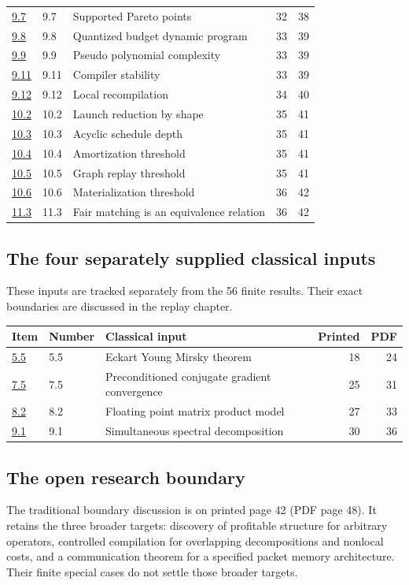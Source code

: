 {\begin{longtable}{@{}p{.10\linewidth}p{.11\linewidth}p{.51\linewidth}rr@{}}
\hyperref[result:9.7]{9.7} & 9.7 & Supported Pareto points & 32 & 38\\
\hyperref[result:9.8]{9.8} & 9.8 & Quantized budget dynamic program & 33 & 39\\
\hyperref[result:9.9]{9.9} & 9.9 & Pseudo polynomial complexity & 33 & 39\\
\hyperref[result:9.11]{9.11} & 9.11 & Compiler stability & 33 & 39\\
\hyperref[result:9.12]{9.12} & 9.12 & Local recompilation & 34 & 40\\
\hyperref[result:10.2]{10.2} & 10.2 & Launch reduction by shape & 35 & 41\\
\hyperref[result:10.3]{10.3} & 10.3 & Acyclic schedule depth & 35 & 41\\
\hyperref[result:10.4]{10.4} & 10.4 & Amortization threshold & 35 & 41\\
\hyperref[result:10.5]{10.5} & 10.5 & Graph replay threshold & 35 & 41\\
\hyperref[result:10.6]{10.6} & 10.6 & Materialization threshold & 36 & 42\\
\hyperref[result:11.3]{11.3} & 11.3 & Fair matching is an equivalence relation & 36 & 42\\
\bottomrule\end{longtable}}
\subsection{The four separately supplied classical inputs}
These inputs are tracked separately from the 56 finite results. Their exact boundaries are discussed in the replay chapter.

{\small\begin{longtable}{@{}p{.10\linewidth}p{.11\linewidth}p{.51\linewidth}rr@{}}\toprule Item & Number & Classical input & Printed & PDF\\\midrule\endhead
\hyperref[result:5.5]{5.5} & 5.5 & Eckart Young Mirsky theorem & 18 & 24\\
\hyperref[result:7.5]{7.5} & 7.5 & Preconditioned conjugate gradient convergence & 25 & 31\\
\hyperref[result:8.2]{8.2} & 8.2 & Floating point matrix product model & 27 & 33\\
\hyperref[result:9.1]{9.1} & 9.1 & Simultaneous spectral decomposition & 30 & 36\\
\bottomrule\end{longtable}}
\subsection{The open research boundary}
The traditional boundary discussion is on printed page 42 (PDF page 48). It retains the three broader targets: discovery of profitable structure for arbitrary operators, controlled compilation for overlapping decompositions and nonlocal costs, and a communication theorem for a specified packet memory architecture. Their finite special cases do not settle those broader targets.
